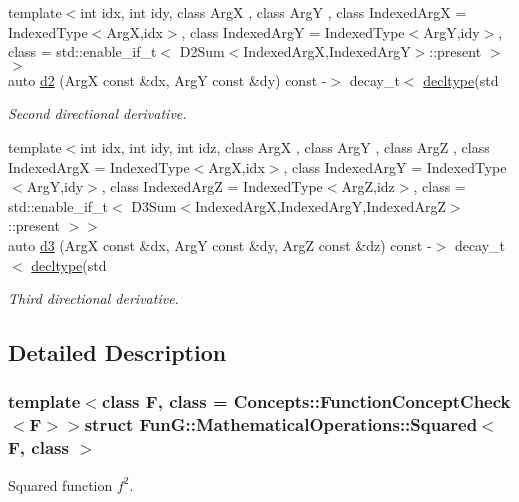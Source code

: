 \begin{DoxyCompactItemize}
{\footnotesize template$<$int idx, int idy, class Arg\-X , class Arg\-Y , class Indexed\-Arg\-X  = \-Indexed\-Type$<$\-Arg\-X,idx$>$, class Indexed\-Arg\-Y  = \-Indexed\-Type$<$\-Arg\-Y,idy$>$, class  = std\-::enable\-\_\-if\-\_\-t$<$ D2\-Sum$<$\-Indexed\-Arg\-X,\-Indexed\-Arg\-Y$>$\-::present $>$$>$ }\\auto \hyperlink{structFunG_1_1MathematicalOperations_1_1Squared_ade05d295a7fd4aa03a2ccd595c03b463}{d2} (\-Arg\-X const \&dx, \-Arg\-Y const \&dy) const -\/$>$ decay\-\_\-t$<$ \hyperlink{structFunG_1_1MathematicalOperations_1_1Squared_af0560fc3c8a6eed252dfece751a8378d}{decltype}(std
\begin{DoxyCompactList}\small\item\em \-Second directional derivative. \end{DoxyCompactList}\item 
{\footnotesize template$<$int idx, int idy, int idz, class Arg\-X , class Arg\-Y , class Arg\-Z , class Indexed\-Arg\-X  = \-Indexed\-Type$<$\-Arg\-X,idx$>$, class Indexed\-Arg\-Y  = \-Indexed\-Type$<$\-Arg\-Y,idy$>$, class Indexed\-Arg\-Z  = \-Indexed\-Type$<$\-Arg\-Z,idz$>$, class  = std\-::enable\-\_\-if\-\_\-t$<$ D3\-Sum$<$\-Indexed\-Arg\-X,\-Indexed\-Arg\-Y,\-Indexed\-Arg\-Z$>$\-::present $>$$>$ }\\auto \hyperlink{structFunG_1_1MathematicalOperations_1_1Squared_a3ead8484cd541d73786747ebca1758e0}{d3} (\-Arg\-X const \&dx, \-Arg\-Y const \&dy, \-Arg\-Z const \&dz) const -\/$>$ decay\-\_\-t$<$ \hyperlink{structFunG_1_1MathematicalOperations_1_1Squared_af0560fc3c8a6eed252dfece751a8378d}{decltype}(std
\begin{DoxyCompactList}\small\item\em \-Third directional derivative. \end{DoxyCompactList}\end{DoxyCompactItemize}


\subsection{\-Detailed \-Description}
\subsubsection*{template$<$class F, class = \-Concepts\-::\-Function\-Concept\-Check$<$\-F$>$$>$struct Fun\-G\-::\-Mathematical\-Operations\-::\-Squared$<$ F, class $>$}

\-Squared function $f^2$. 


